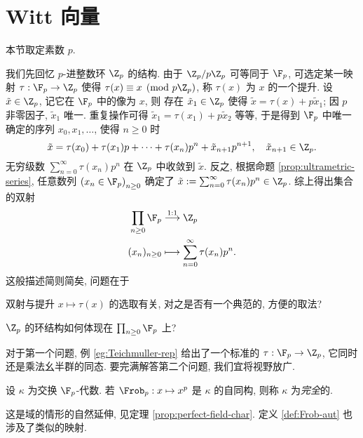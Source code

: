 \section{Witt 向量}\label{sec:Witt-vector}
本节取定素数 $p$.

我们先回忆 $p$-进整数环 $\Z_p$ 的结构. 由于 $\Z_p/p\Z_p$ 可等同于 $\F_p$, 可选定某一映射 $\tau: \F_p \to \Z_p$ 使得 $\tau(x) \equiv x \pmod {p\Z_p}$, 称 $\tau(x)$ 为 $x$ 的一个提升. 设 $\tilde{x} \in \Z_p$, 记它在 $\F_p$ 中的像为 $x$, 则 存在 $\tilde{x}_1 \in \Z_p$ 使得 $\tilde{x} = \tau(x) + p \tilde{x}_1$; 因 $p$ 非零因子, $\tilde{x}_1$ 唯一. 重复操作可得 $\tilde{x}_1 = \tau(x_1) + p\tilde{x}_2$ 等等, 于是得到 $\F_p$ 中唯一确定的序列 $x_0, x_1, \ldots$, 使得 $n \geq 0$ 时
\[ \tilde{x} = \tau(x_0) + \tau(x_1) p + \cdots + \tau(x_n) p^n + \tilde{x}_{n+1} p^{n+1}, \quad \tilde{x}_{n+1} \in \Z_p. \]
无穷级数 $\sum_{n=0}^\infty \tau(x_n) p^n$ 在 $\Z_p$ 中收敛到 $\tilde{x}$. 反之, 根据命题 \ref{prop:ultrametric-series}, 任意数列 $\left( x_n \in \F_p \right)_{n \geq 0}$ 确定了 $\tilde{x} := \sum_{n=0}^\infty \tau(x_n) p^n \in \Z_p$. 综上得出集合的双射
\begin{align*}
	\prod_{n \geq 0} \F_p & \stackrel{1:1}{\longrightarrow} \Z_p \\
	(x_n)_{n \geq 0} & \longmapsto \sum_{n=0}^\infty \tau(x_n) p^n.
\end{align*}
这般描述简则简矣, 问题在于
\begin{compactitem}
	\item 双射与提升 $x \mapsto \tau(x)$ 的选取有关, 对之是否有一个典范的, 方便的取法?
	\item $\Z_p$ 的环结构如何体现在 $\prod_{n \geq 0} \F_p$ 上?
\end{compactitem}
对于第一个问题, 例 \ref{eg:Teichmuller-rep} 给出了一个标准的 $\tau: \F_p \to \Z_p$, 它同时还是乘法幺半群的同态. 要完满解答第二个问题, 我们宜将视野放广.

\begin{definition}
	设 $\kappa$ 为交换 $\F_p$-代数. 若 $\Frob_p: x \mapsto x^p$ 是 $\kappa$ 的自同构, 则称 $\kappa$ 为\emph{完全}的.
\end{definition}
这是域的情形的自然延伸, 见定理 \ref{prop:perfect-field-char}. 定义 \ref{def:Frob-aut} 也涉及了类似的映射.

